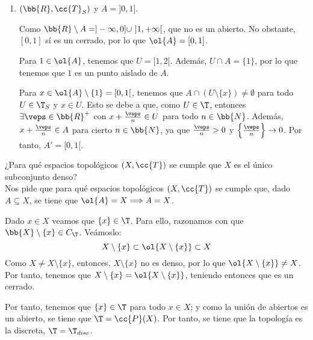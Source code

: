 \begin{ejercicio}
\begin{enumerate}
        Por tanto, tenemos que $A\cap U=A\cap [(X\setminus A)\cup \{x\}] = \{x\}$. Por tanto, tenemos que $x$ es un punto aislado de $A$. Es decir, todos los puntos de $A$ son aislados.

        Sea ahora $x\in X$, y veamos si es un punto de acumulación. Como todos los puntos de $A$ son aislados, tenemos que $x\notin A$. Además, como $A$ es finito, tenemos que $X\setminus A\in \T_{CF}$. Entonces:
        \begin{equation*}
            A\cap ((X\setminus A)\setminus \{x\})
            = A\cap (X\setminus (A\cup \{x\})) = \emptyset
        \end{equation*}
        
        Entonces, $x\notin A'$, y por tanto $A'=\emptyset$.
        
        
        \item $(\bb{R}, \cc{T}_S)$ y $A=]0,1]$.

        Como $\bb{R}\setminus A = ]-\infty, 0]\cup~]1,+\infty[$, que no es un abierto. No obstante, $[0,1]$ sí es un cerrado, por lo que $\ol{A}=[0,1]$.

        Para $1\in \ol{A}$, tenemos que $U=[1,2[$. Además, $U\cap A=\{1\}$, por lo que tenemos que $1$ es un punto aislado de $A$.

        Para $x\in \ol{A}\setminus \{1\}=[0,1[$, tenemos que $A\cap (U\setminus \{x\})\neq \emptyset$ para todo $U\in \T_S$ y $x\in U$. Esto se debe a que, como $U\in \T$, entonces $\exists \veps\in \bb{R}^+$ con $x+\frac{\veps}{n}\in U$ para todo $n\in \bb{N}$. Además, $x+\frac{\veps}{n}\in A$ para cierto $n\in \bb{N}$, ya que $\frac{\veps}{n}>0$ y $\left\{\frac{\veps}{n}\right\}\to 0$. Por tanto, $A'=[0,1[$.

        
    \end{enumerate}
\end{ejercicio}

\begin{ejercicio}
    ¿Para qué espacios topológicos $(X,\cc{T})$ se cumple que $X$ es el único subconjunto denso?\\

    Nos pide que para qué espacios topológicos $(X,\cc{T})$ se cumple que, dado $A\subseteq X$, se tiene que $\ol{A}=X\Longrightarrow A=X$.

    Dado $x\in X$ veamos que $\{x\}\in \T$. Para ello, razonamos con que $\bb{X}\setminus \{x\}\in C_\T$. Veámoslo:
    \begin{equation*}
        X\setminus \{x\} \subset \ol{X\setminus \{x\}} \subset X
    \end{equation*}
    Como $X\neq X\setminus \{x\}$, entonces, $X\setminus \{x\}$ no es denso, por lo que $\ol{X\setminus \{x\}}\neq X$. Por tanto, tenemos que $X\setminus \{x\}=\ol{X\setminus \{x\}}$, teniendo entonces que es un cerrado. 

    Por tanto, tenemos que $\{x\}\in \T$ para todo $x\in X$; y como la unión de abiertos es un abierto, se tiene que $\T=\cc{P}(X)$. Por tanto, se tiene que la topología es la discreta, $\T=\T_{disc}$.
\end{ejercicio}

